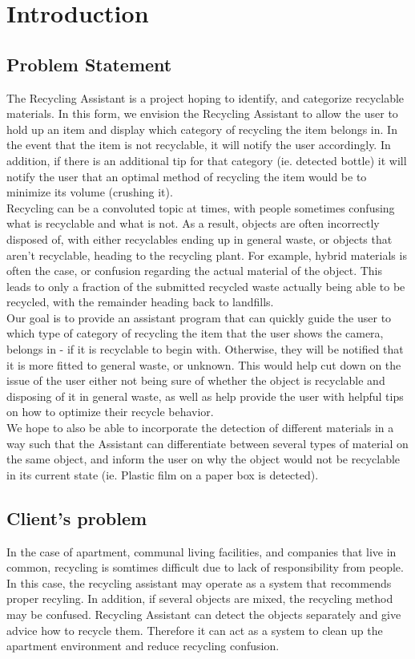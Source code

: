 \documentclass[conference]{IEEEtran}
\begin{document}
\newpage

\section{Introduction}
\subsection{Problem Statement}
The Recycling Assistant is a project hoping to identify, and categorize recyclable materials. In this form, we envision the Recycling Assistant to allow the user to hold up an item and display which category of recycling the item belongs in. In the event that the item is not recyclable, it will notify the user accordingly. In addition, if there is an additional tip for that category (ie. detected bottle) it will notify the user that an optimal method of recycling the item would be to minimize its volume (crushing it). \\
Recycling can be a convoluted topic at times, with people sometimes confusing what is recyclable and what is not. As a result, objects are often incorrectly disposed of, with either recyclables ending up in general waste, or objects that aren't recyclable, heading to the recycling plant. For example, hybrid materials is often the case, or confusion regarding the actual material of the object. This leads to only a fraction of the submitted recycled waste actually being able to be recycled, with the remainder heading back to landfills. \\

Our goal is to provide an assistant program that can quickly guide the user to which type of category of recycling the item that the user shows the camera, belongs in - if it is recyclable to begin with. Otherwise, they will be notified that it is more fitted to general waste, or unknown. This would help cut down on the issue of the user either not being sure of whether the object is recyclable and disposing of it in general waste, as well as help provide the user with helpful tips on how to optimize their recycle behavior.\\
We hope to also be able to incorporate the detection of different materials in a way such that the Assistant can differentiate between several types of material on the same object, and inform the user on why the object would not be recyclable in its current state (ie. Plastic film on a paper box is detected).\\

\subsection{Client's problem}
In the case of apartment, communal living facilities, and companies that live in common, recycling is somtimes difficult due to lack of responsibility from people. In this case, the recycling assistant may operate as a system that recommends proper recyling. In addition, if several objects are mixed, the recycling method may be confused. Recycling Assistant can detect the objects separately and give advice how to recycle them. Therefore it can act as a system to clean up the apartment environment and reduce recycling confusion.\\
\end{document}
